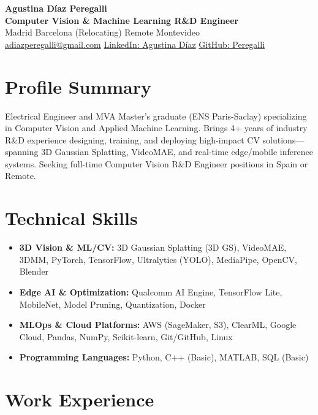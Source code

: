 \documentclass[10pt, a4paper]{article}
\begin{document}
\begin{center}
    {\LARGE \textbf{Agustina Díaz Peregalli}} \\ \vspace{2pt}
    {\large \textbf{Computer Vision \& Machine Learning R\&D Engineer}} \\ \vspace{2pt}
    Madrid \textbar{} Barcelona (Relocating) \textbar{} Remote \textbar{} Montevideo \\ \vspace{2pt}
    \href{mailto:adiazperegalli@gmail.com}{adiazperegalli@gmail.com} \textbar{} 
    \href{https://www.linkedin.com/in/agustina-diaz-peregalli/}{LinkedIn: Agustina Díaz} \textbar{} 
    \href{https://github.com/Peregalli}{GitHub: Peregalli}
\end{center}

\section{Profile Summary}
Electrical Engineer and MVA Master's graduate (ENS Paris-Saclay) specializing in Computer Vision and Applied Machine Learning. Brings 4+ years of industry R\&D experience designing, training, and deploying high-impact CV solutions—spanning 3D Gaussian Splatting, VideoMAE, and real-time edge/mobile inference systems. Seeking full-time Computer Vision R\&D Engineer positions in Spain or Remote.

\section{Technical Skills}
\begin{itemize}
    \item \textbf{3D Vision \& ML/CV:} 3D Gaussian Splatting (3D GS), VideoMAE, 3DMM, PyTorch, TensorFlow, Ultralytics (YOLO), MediaPipe, OpenCV, Blender
    \item \textbf{Edge AI \& Optimization:} Qualcomm AI Engine, TensorFlow Lite, MobileNet, Model Pruning, Quantization, Docker
    \item \textbf{MLOps \& Cloud Platforms:} AWS (SageMaker, S3), ClearML, Google Cloud, Pandas, NumPy, Scikit-learn, Git/GitHub, Linux
    \item \textbf{Programming Languages:} Python, C++ (Basic), MATLAB, SQL (Basic)
\end{itemize}

\section{Work Experience}
\end{document}
